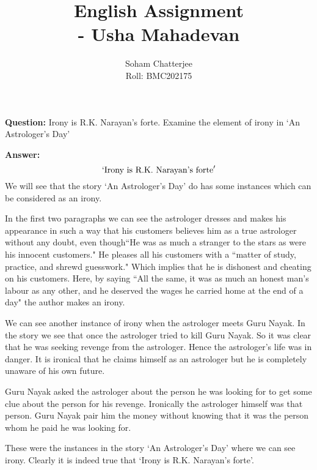 \documentclass{article}
\title{\huge{English Assignment\\\hspace{7cm}- Usha Mahadevan}
}
\author{Soham Chatterjee\\Roll: BMC202175}
\date{}
\begin{document}
	\textbf{Question:} Irony is R.K. Narayan’s forte. Examine the element of irony in ‘An Astrologer’s Day’
	
	\textbf{Answer:} $$`\text{Irony is R.K. Narayan’s forte}'$$We will see that the story `An Astrologer's Day' do has some instances which can be considered as an irony.
	
	\hspace*{1cm}In the first two paragraphs we can see the astrologer dresses and makes his appearance in such a way that his customers believes him as a true astrologer without any doubt, even though``{He was as much a stranger to the stars as were his innocent customers.}" He pleases all his customers with a ``matter of study, practice, and shrewd guesswork." Which implies that he is dishonest and cheating on his customers. Here, by saying ``{All the same, it was as much an honest man’s labour as any other, and he deserved the wages he carried home at the end of a day"} the author makes an irony.
	
	\hspace*{1cm}We can see another instance of irony when the astrologer meets Guru Nayak. In the story we see that once the astrologer tried to kill Guru Nayak. So it was clear that he was seeking revenge from the astrologer. Hence the astrologer's life was in danger. It is ironical that he claims himself as an astrologer but he is completely unaware of his own future.
	
	\hspace*{1cm}Guru Nayak asked the astrologer about the person he was looking for to get some clue about the person for his revenge. Ironically the astrologer himself was that person. Guru Nayak pair him the money without knowing that it was the person whom he paid he was looking for.
	
	\hspace*{1cm}These were the instances in the story `An Astrologer's Day' where we can see irony. Clearly it is indeed true that `Irony is R.K. Narayan’s forte'.
\end{document}
